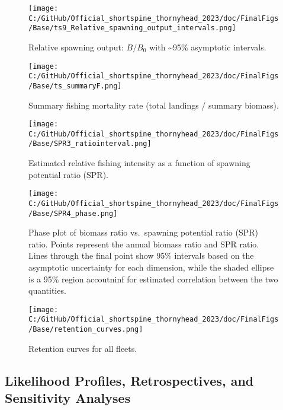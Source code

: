 \documentclass[11pt,
  english,
  letterpaper,
]{article}
\begin{document}
\begin{figure}
\centering
\texttt{[image: C:/GitHub/Official\_shortspine\_thornyhead\_2023/doc/FinalFigs/Base/ts9\_Relative\_spawning\_output\_intervals.png]}
\caption{Relative spawning output: \(B/B_0\) with \textasciitilde95\% asymptotic intervals.\label{fig:relspawnout}}
\end{figure}

\begin{figure}
\centering
\texttt{[image: C:/GitHub/Official\_shortspine\_thornyhead\_2023/doc/FinalFigs/Base/ts\_summaryF.png]}
\caption{Summary fishing mortality rate (total landings / summary biomass).\label{fig:summary_f}}
\end{figure}

\begin{figure}
\centering
\texttt{[image: C:/GitHub/Official\_shortspine\_thornyhead\_2023/doc/FinalFigs/Base/SPR3\_ratiointerval.png]}
\caption{Estimated relative fishing intensity as a function of spawning potential ratio (SPR).\label{fig:spr_trajectory}}
\end{figure}

\begin{figure}
\centering
\texttt{[image: C:/GitHub/Official\_shortspine\_thornyhead\_2023/doc/FinalFigs/Base/SPR4\_phase.png]}
\caption{Phase plot of biomass ratio vs.~spawning potential ratio (SPR) ratio. Points represent the annual biomass ratio and SPR ratio. Lines through the final point show 95\% intervals based on the asymptotic uncertainty for each dimension, while the shaded ellipse is a 95\% region accoutninf for estimated correlation between the two quantities.\label{fig:phase_diagram}}
\end{figure}

\begin{figure}
\centering
\texttt{[image: C:/GitHub/Official\_shortspine\_thornyhead\_2023/doc/FinalFigs/Base/retention\_curves.png]}
\caption{Retention curves for all fleets.\label{fig:retencurvs}}
\end{figure}

\clearpage

\hypertarget{likelihood-profiles-retrospectives-and-sensitivity-analyses}{%
\subsection{Likelihood Profiles, Retrospectives, and Sensitivity Analyses}\label{likelihood-profiles-retrospectives-and-sensitivity-analyses}}
\end{document}
